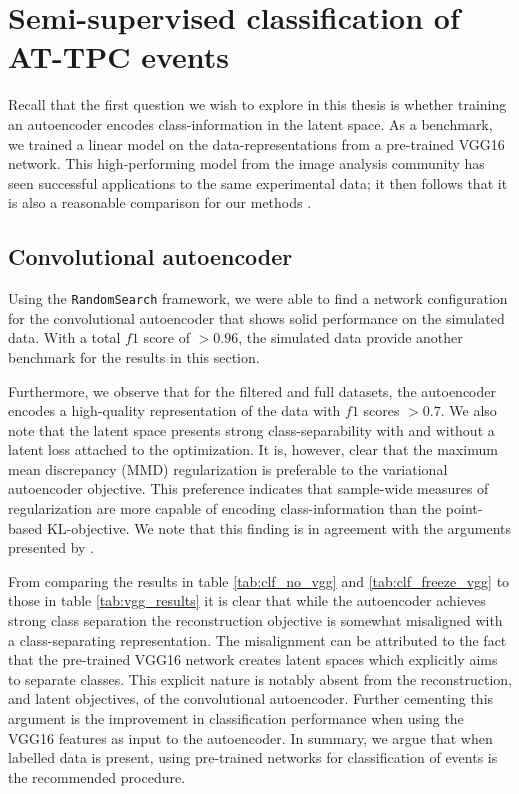 \section{Semi-supervised classification of AT-TPC events}
Recall that the first question we wish to explore in this thesis is whether training an autoencoder encodes class-information in the latent space. As a benchmark, we trained a linear model on the data-representations from a pre-trained VGG16 network. This high-performing model from the image analysis community has seen successful applications to the same experimental data; it then follows that it is also a reasonable comparison for our methods \cite{Kuchera2019}. 

\subsection{Convolutional autoencoder}
Using the \lstinline{RandomSearch} framework, we were able to find a network configuration for the convolutional autoencoder that shows solid performance on the simulated data. With a total $f1$ score of $>0.96$, the simulated data provide another benchmark for the results in this section.

 Furthermore, we observe that for the filtered and full datasets, the autoencoder encodes a high-quality representation of the data with $f1$ scores $>0.7$. We also note that the latent space presents strong class-separability with and without a latent loss attached to the optimization. It is, however, clear that the maximum mean discrepancy (MMD) regularization is preferable to the variational autoencoder objective. This preference indicates that sample-wide measures of regularization are more capable of encoding class-information than the point-based KL-objective. We note that this finding is in agreement with the arguments presented by \citet{Zhao}. 

 From comparing the results in table \ref{tab:clf_no_vgg} and \ref{tab:clf_freeze_vgg} to those in table \ref{tab:vgg_results} it is clear that while the autoencoder achieves strong class separation the reconstruction objective is somewhat misaligned with a class-separating representation. The misalignment can be attributed to the fact that the pre-trained VGG16 network creates latent spaces which explicitly aims to separate classes. This explicit nature is notably absent from the reconstruction, and latent objectives, of the convolutional autoencoder. Further cementing this argument is the improvement in classification performance when using the VGG16 features as input to the autoencoder. In summary, we argue that when labelled data is present, using pre-trained networks for classification of events is the recommended procedure.

